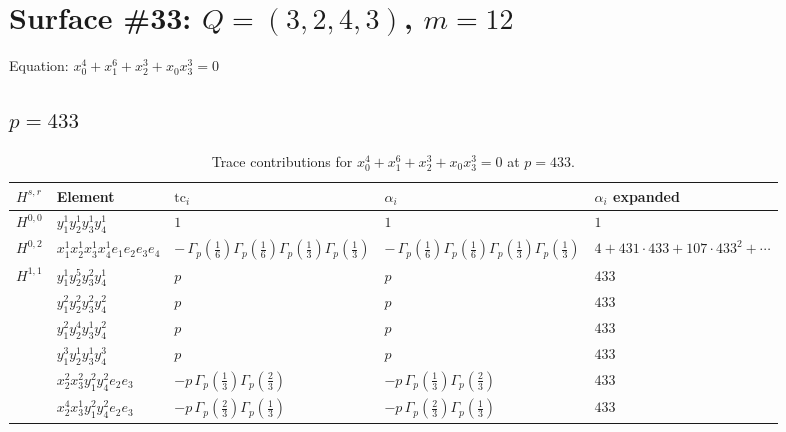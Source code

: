\documentclass[11pt]{article}
\begin{document}
\newpage

\section*{Surface \#33: $Q=(3, 2, 4, 3)$, $m=12$}

Equation: $x_0^{4} + x_1^{6} + x_2^{3} + x_0 x_3^{3} = 0$

\subsection*{$p = 433$}

\begin{table}[ht]
\centering
\caption{Trace contributions for $x_0^{4} + x_1^{6} + x_2^{3} + x_0 x_3^{3} = 0$ at $p=433$.}\label{tab:deformed-33}
\renewcommand{\arraystretch}{1.1}
{\scriptsize
\begin{tabular}{@{}lllll@{}}
\toprule
$H^{s,r}$ & Element & $\mathrm{tc}_i$ & $\alpha_i$ & $\alpha_i$ expanded \\
\midrule
$H^{0,0}$ & $y_{1}^{1} y_{2}^{1} y_{3}^{1} y_{4}^{1}$ & $1$ & $1$ & $1$ \\
\midrule
$H^{0,2}$ & $x_{1}^{1} x_{2}^{1} x_{3}^{1} x_{4}^{1}  e_{1} e_{2} e_{3} e_{4}$ & $- \, \Gamma_p \left( \frac{1}{6} \right) \Gamma_p \left( \frac{1}{6} \right) \Gamma_p \left( \frac{1}{3} \right) \Gamma_p \left( \frac{1}{3} \right)$ & $- \, \Gamma_p \left( \frac{1}{6} \right) \Gamma_p \left( \frac{1}{6} \right) \Gamma_p \left( \frac{1}{3} \right) \Gamma_p \left( \frac{1}{3} \right)$ & $4{+}431{\cdot}433{+}107{\cdot}433^{2}{+}\cdots$ \\
\midrule
$H^{1,1}$ & $y_{1}^{1} y_{2}^{5} y_{3}^{2} y_{4}^{1}$ & $p \,$ & $p \,$ & $433$ \\
 & $y_{1}^{2} y_{2}^{2} y_{3}^{2} y_{4}^{2}$ & $p \,$ & $p \,$ & $433$ \\
 & $y_{1}^{2} y_{2}^{4} y_{3}^{1} y_{4}^{2}$ & $p \,$ & $p \,$ & $433$ \\
 & $y_{1}^{3} y_{2}^{1} y_{3}^{1} y_{4}^{3}$ & $p \,$ & $p \,$ & $433$ \\
 & $x_{2}^{2} x_{3}^{2} y_{1}^{2} y_{4}^{2} e_{2} e_{3}$ & $- p \, \Gamma_p \left( \frac{1}{3} \right) \Gamma_p \left( \frac{2}{3} \right)$ & $- p \, \Gamma_p \left( \frac{1}{3} \right) \Gamma_p \left( \frac{2}{3} \right)$ & $433$ \\
 & $x_{2}^{4} x_{3}^{1} y_{1}^{2} y_{4}^{2} e_{2} e_{3}$ & $- p \, \Gamma_p \left( \frac{2}{3} \right) \Gamma_p \left( \frac{1}{3} \right)$ & $- p \, \Gamma_p \left( \frac{2}{3} \right) \Gamma_p \left( \frac{1}{3} \right)$ & $433$ \\

\end{tabular}}
\end{table}
\end{document}
